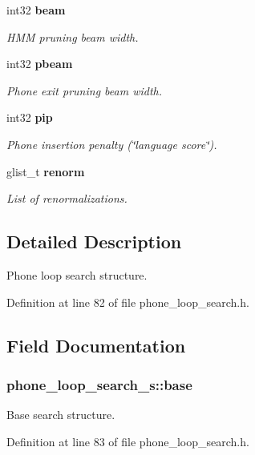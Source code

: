 \begin{DoxyCompactItemize}
int32 {\bf beam}
\begin{DoxyCompactList}\small\item\em H\-M\-M pruning beam width. \end{DoxyCompactList}\item 
int32 {\bf pbeam}
\begin{DoxyCompactList}\small\item\em Phone exit pruning beam width. \end{DoxyCompactList}\item 
int32 {\bf pip}
\begin{DoxyCompactList}\small\item\em Phone insertion penalty (\char`\"{}language score\char`\"{}). \end{DoxyCompactList}\item 
glist\-\_\-t {\bf renorm}
\begin{DoxyCompactList}\small\item\em List of renormalizations. \end{DoxyCompactList}\end{DoxyCompactItemize}


\subsection{Detailed Description}
Phone loop search structure. 

Definition at line 82 of file phone\-\_\-loop\-\_\-search.\-h.



\subsection{Field Documentation}
\subsubsection[{base}]{ phone\-\_\-loop\-\_\-search\-\_\-s\-::base}\label{structphone__loop__search__s_aea1cf9ffda814f681b57f32c1f8cc3b1}


Base search structure. 



Definition at line 83 of file phone\-\_\-loop\-\_\-search.\-h.

